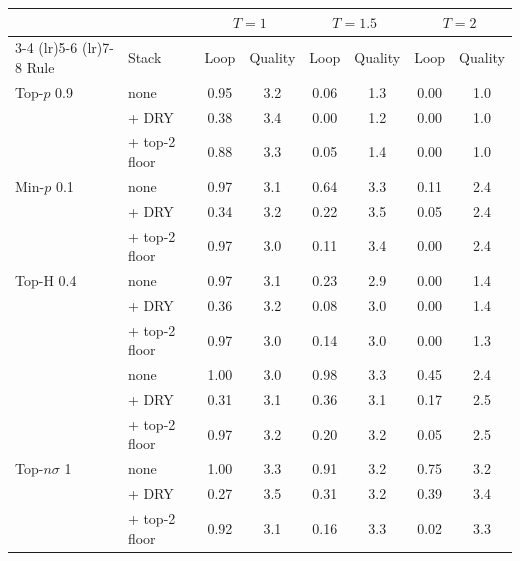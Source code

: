 \begin{tabular}{llcccccc}
\toprule
 & & \multicolumn{2}{c}{$T{=}1$} & \multicolumn{2}{c}{$T{=}1.5$} & \multicolumn{2}{c}{$T{=}2$} \\
\cmidrule(lr){3-4} \cmidrule(lr){5-6} \cmidrule(lr){7-8}
Rule & Stack & Loop & Quality & Loop & Quality & Loop & Quality \\
\midrule
Top-$p$ 0.9 & none & 0.95 & 3.2 & 0.06 & 1.3 & 0.00 & 1.0 \\
 & + DRY & 0.38 & 3.4 & 0.00 & 1.2 & 0.00 & 1.0 \\
 & + top-2 floor & 0.88 & 3.3 & 0.05 & 1.4 & 0.00 & 1.0 \\
\addlinespace[2pt]
Min-$p$ 0.1 & none & 0.97 & 3.1 & 0.64 & 3.3 & 0.11 & 2.4 \\
 & + DRY & 0.34 & 3.2 & 0.22 & 3.5 & 0.05 & 2.4 \\
 & + top-2 floor & 0.97 & 3.0 & 0.11 & 3.4 & 0.00 & 2.4 \\
\addlinespace[2pt]
Top-H 0.4 & none & 0.97 & 3.1 & 0.23 & 2.9 & 0.00 & 1.4 \\
 & + DRY & 0.36 & 3.2 & 0.08 & 3.0 & 0.00 & 1.4 \\
 & + top-2 floor & 0.97 & 3.0 & 0.14 & 3.0 & 0.00 & 1.3 \\
\addlinespace[2pt]
\pless{} & none & 1.00 & 3.0 & 0.98 & 3.3 & 0.45 & 2.4 \\
 & + DRY & 0.31 & 3.1 & 0.36 & 3.1 & 0.17 & 2.5 \\
 & + top-2 floor & 0.97 & 3.2 & 0.20 & 3.2 & 0.05 & 2.5 \\
\addlinespace[2pt]
Top-$n\sigma$ 1 & none & 1.00 & 3.3 & 0.91 & 3.2 & 0.75 & 3.2 \\
 & + DRY & 0.27 & 3.5 & 0.31 & 3.2 & 0.39 & 3.4 \\
 & + top-2 floor & 0.92 & 3.1 & 0.16 & 3.3 & 0.02 & 3.3 \\
\bottomrule
\end{tabular}
